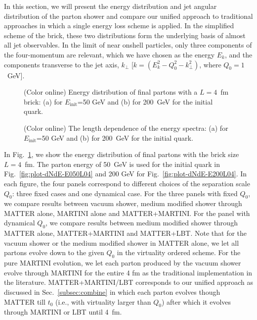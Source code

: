 \documentclass[aps,prc,twocolumn,floatfix,superscriptaddress,nofootinbib]{revtex4}
\begin{document}
In this section, we will present the energy distribution and jet angular distribution of the parton shower and compare our unified approach to traditional approaches in which a single energy loss scheme is applied. In the simplified scheme of the brick, these two distributions form the underlying basis of almost all jet observables. In the limit of near onshell particles, only three components of the four-momentum are relevant, which we have chosen as the energy $E_{k}$, and the components transverse to the jet axis, 
$k_\perp$ [$k = \left( E_{k}^{2} - Q_{0}^{2} - k_{\perp}^{2}  \right)$, where $Q_0 =1$~GeV].

\begin{figure}[tb]
  \caption{(Color online) Energy distribution of final partons with a $L=4$~fm brick: (a) for $E_\mathrm{init}$=50 GeV and (b) for 200~GeV for the initial quark.}
  \label{fig:plot-dNdE-L04}
\end{figure}

\begin{figure}[tb]
  \caption{(Color online) The length dependence of the energy spectra: (a) for $E_\mathrm{init}$=50 GeV and (b) for 200~GeV for the initial quark.}
  \label{fig:plot-dNdE-LDep}
\end{figure}

In Fig.~\ref{fig:plot-dNdE-L04}, we show the energy distribution of final partons with the brick size $L=4$~fm. The parton energy of 50~GeV is used for the initial quark in Fig.~\ref{fig:plot-dNdE-E050L04} and 200 GeV for Fig.~\ref{fig:plot-dNdE-E200L04}. In each figure, the four panels correspond to different choices of the separation scale $Q_0$: three fixed cases and one dynamical case. For the three panels with fixed $Q_0$, we compare results between vacuum shower, medium modified shower through MATTER alone, MARTINI alone and MATTER+MARTINI. For the panel with dynamical $Q_0$, we compare results between medium modified shower through MATTER alone, MATTER+MARTINI and MATTER+LBT. Note that for the vacuum shower or the medium modified shower in MATTER alone, we let all partons evolve down to the given $Q_0$ in the virtuality ordered scheme. For the pure MARTINI evolution, we let each parton produced by the vacuum shower evolve through MARTINI for the entire 4 fm as the traditional implementation in the literature. MATTER+MARTINI/LBT corresponds to our unified approach as discussed in Sec.~\ref{subsec:combine} in which each parton evolves though MATTER till $t_0$ (i.e., with virtuality larger than $Q_0$) after which it evolves through MARTINI or LBT until 4~fm.
\end{document}
